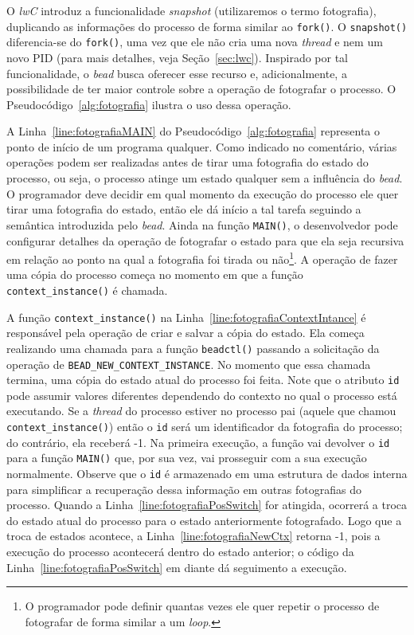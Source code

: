 O \emph{lwC} introduz a funcionalidade \emph{snapshot} (utilizaremos o termo
fotografia), duplicando as informações do processo de forma
similar ao \texttt{fork()}. O \texttt{snapshot()} diferencia-se do
\texttt{fork()}, uma vez que ele não cria uma nova \emph{thread} e nem um novo PID
(para mais detalhes, veja Seção~\ref{sec:lwc}). Inspirado por tal
funcionalidade, o \emph{bead} busca oferecer esse recurso e, adicionalmente, a
possibilidade de ter maior controle sobre a operação de fotografar o processo.
O Pseudocódigo~\ref{alg:fotografia} ilustra o uso dessa operação.



A Linha~\ref{line:fotografiaMAIN} do Pseudocódigo~\ref{alg:fotografia}
representa o ponto de início de um programa qualquer. Como indicado no
comentário, várias operações podem ser realizadas antes de tirar uma fotografia
do estado do processo, ou seja, o processo atinge um estado qualquer sem a
influência do \emph{bead}. O programador deve decidir em qual momento da
execução do processo ele quer tirar uma fotografia do estado, então ele dá
início a tal tarefa seguindo a semântica introduzida pelo \emph{bead}. Ainda na
função \texttt{MAIN()}, o desenvolvedor pode configurar detalhes da operação de
fotografar o estado para que ela seja recursiva em relação ao ponto na qual a
fotografia foi tirada ou não\footnote{O programador pode definir quantas vezes
ele quer repetir o processo de fotografar de forma similar a um \emph{loop}.}.
A operação de fazer uma cópia do processo começa no momento em que a função
\texttt{context\_instance()} é chamada.

A função \texttt{context\_instance()} na
Linha~\ref{line:fotografiaContextIntance} é responsável pela operação de criar
e salvar a cópia do estado. Ela começa realizando uma chamada para a função
\texttt{beadctl()} passando a solicitação da operação de
\texttt{BEAD\_NEW\_CONTEXT\_INSTANCE}. No momento que essa chamada termina, uma
cópia do estado atual do processo foi feita. Note que o atributo \texttt{id}
pode assumir valores diferentes dependendo do contexto no qual o processo está
executando. Se a \emph{thread} do processo estiver no processo pai (aquele que
chamou \texttt{context\_instance()}) então o \texttt{id} será um identificador
da fotografia do processo; do contrário, ela receberá -1. Na primeira execução,
a função vai devolver o \texttt{id} para a função \texttt{MAIN()} que, por sua
vez, vai prosseguir com a sua execução normalmente. Observe que o \texttt{id} é
armazenado em uma estrutura de dados interna para simplificar a recuperação
dessa informação em outras fotografias do processo. Quando a
Linha~\ref{line:fotografiaPosSwitch} for atingida, ocorrerá a troca do estado
atual do processo para o estado anteriormente fotografado. Logo que a troca de
estados acontece, a Linha~\ref{line:fotografiaNewCtx} retorna -1, pois a
execução do processo acontecerá dentro do estado anterior; o código da
Linha~\ref{line:fotografiaPosSwitch} em diante dá seguimento a execução.

